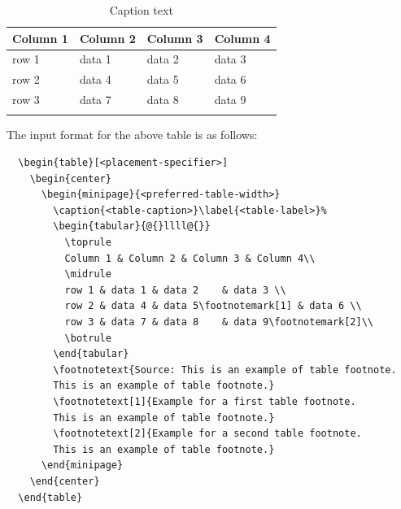 \documentclass[pdflatex,sn-mathphys]{sn-jnl}%
\theoremstyle{thmstyleone}%
\theoremstyle{thmstyletwo}%
\theoremstyle{thmstylethree}%
\begin{document}
\begin{table}[h]
  \begin{center}
    \begin{minipage}{174pt}
      \caption{Caption text}\label{tab1}%
      \begin{tabular}{@{}llll@{}}
        \toprule
        Column 1 & Column 2  & Column 3 & Column 4\\
        \midrule
        row 1    & data 1   & data 2  & data 3  \\
        row 2    & data 4   & data 5\footnotemark[1]  & data 6  \\
        row 3    & data 7   & data 8  & data 9\footnotemark[2]  \\
        \botrule
      \end{tabular}
    \end{minipage}
  \end{center}
\end{table}

\noindent
The input format for the above table is as follows:

\bigskip
\begin{verbatim}
  \begin{table}[<placement-specifier>]
    \begin{center}
      \begin{minipage}{<preferred-table-width>}
        \caption{<table-caption>}\label{<table-label>}%
        \begin{tabular}{@{}llll@{}}
          \toprule
          Column 1 & Column 2 & Column 3 & Column 4\\
          \midrule
          row 1 & data 1 & data 2	 & data 3 \\
          row 2 & data 4 & data 5\footnotemark[1] & data 6 \\
          row 3 & data 7 & data 8	 & data 9\footnotemark[2]\\
          \botrule
        \end{tabular}
        \footnotetext{Source: This is an example of table footnote.
        This is an example of table footnote.}
        \footnotetext[1]{Example for a first table footnote.
        This is an example of table footnote.}
        \footnotetext[2]{Example for a second table footnote.
        This is an example of table footnote.}
      \end{minipage}
    \end{center}
  \end{table}
\end{verbatim}
\bigskip
\end{document}
